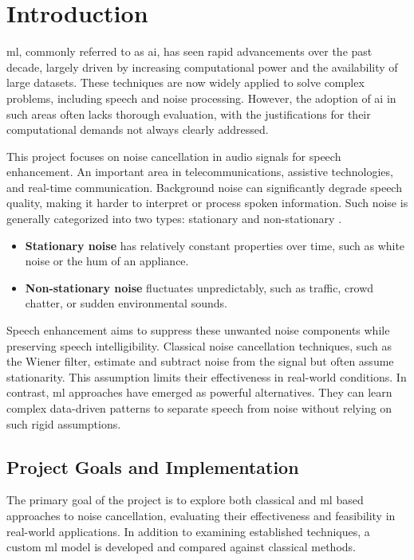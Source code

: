 \graphicspath{{content/chapters/1_introduction/figures}}
\chapter{Introduction}
\label{chp:introduction}

\gls{ml}, commonly referred to as \gls{ai}, has seen rapid advancements over the past decade, largely driven by increasing computational power and the availability of large datasets. These techniques are now widely applied to solve complex problems, including speech and noise processing. However, the adoption of \gls{ai} in such areas often lacks thorough evaluation, with the justifications for their computational demands not always clearly addressed.

This project focuses on noise cancellation in audio signals for speech enhancement. An important area in telecommunications, assistive technologies, and real-time communication. Background noise can significantly degrade speech quality, making it harder to interpret or process spoken information. Such noise is generally categorized into two types: stationary and non-stationary \cite{loizou2013speech}.

\begin{itemize}
    \item \textbf{Stationary noise} has relatively constant properties over time, such as white noise or the hum of an appliance.
    \item \textbf{Non-stationary noise} fluctuates unpredictably, such as traffic, crowd chatter, or sudden environmental sounds.
\end{itemize}

Speech enhancement aims to suppress these unwanted noise components while preserving speech intelligibility. Classical noise cancellation techniques, such as the Wiener filter, estimate and subtract noise from the signal but often assume stationarity. This assumption limits their effectiveness in real-world conditions. In contrast, \gls{ml} approaches have emerged as powerful alternatives. They can learn complex data-driven patterns to separate speech from noise without relying on such rigid assumptions.

\section{Project Goals and Implementation}

The primary goal of the project is to explore both classical and \gls{ml} based approaches to noise cancellation, evaluating their effectiveness and feasibility in real-world applications. In addition to examining established techniques, a custom \gls{ml} model is developed and compared against classical methods.

